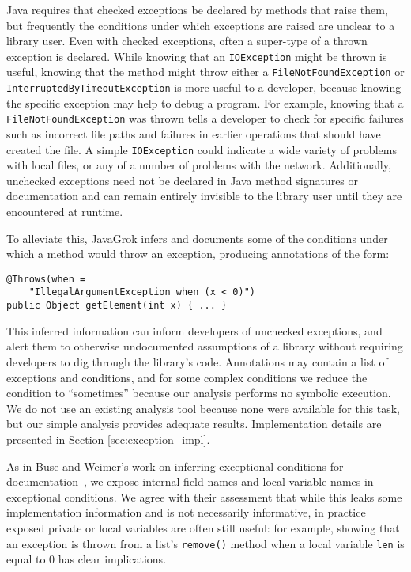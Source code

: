 Java requires that checked exceptions be declared by methods that raise them,
but frequently the conditions under which exceptions are raised are unclear to a
library user. Even with checked exceptions, often a super-type of a thrown
exception is declared.  While knowing that an \texttt{IOException} might be
thrown is useful, knowing that the method might throw either a
\texttt{FileNotFoundException} or \texttt{InterruptedByTimeoutException} is more
useful to a developer, because knowing the specific exception may help to debug
a program.  For example, knowing that a \texttt{FileNotFoundException} was thrown tells a
developer to check for specific failures such as incorrect file paths and
failures in earlier operations that should
have created the file.  A simple \texttt{IOException} could
indicate a wide variety of problems with local files, or any of a number of problems
with the network.  Additionally, unchecked exceptions need not be declared in Java method
signatures or documentation and can remain entirely invisible to the library
user until they are encountered at runtime.

To alleviate this, JavaGrok infers and documents some of the conditions under which a method would
throw an exception, producing annotations of the form:

\begin{verbatim}
@Throws(when =
    "IllegalArgumentException when (x < 0)")
public Object getElement(int x) { ... }
\end{verbatim}

This inferred information can inform developers of unchecked exceptions,
and alert them to otherwise undocumented assumptions of a library without
requiring developers to dig through the library's code.
Annotations may contain a list of exceptions and conditions, and for some
complex conditions we reduce the condition to ``sometimes'' because our analysis
performs no symbolic execution.  We do not use an
existing analysis tool because none were available for this task, but our
simple analysis provides adequate results.  Implementation details are presented
in Section \ref{sec:exception_impl}.

As in Buse and Weimer's work on inferring exceptional conditions for
documentation~\cite{autodoc}, we expose internal field names and
local variable names in exceptional conditions.  We agree with their assessment
that while this leaks some
implementation information and is not necessarily informative, in practice
exposed private or local variables are often still useful: for example, showing that an exception is
thrown from a list's \texttt{remove()} method when a local variable \texttt{len}
is equal to 0 has clear implications.

